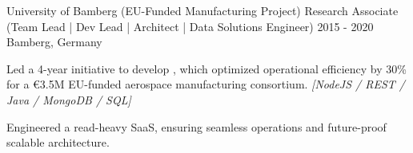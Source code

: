 \begin{cventries}
    




    
        
  \cventry
    {University of Bamberg (EU-Funded Manufacturing Project)} %
    {Research Associate (Team Lead | Dev Lead | Architect | Data Solutions Engineer)} %
    {2015 - 2020} %
    {Bamberg, Germany} %
    {
      \begin{cvitems} %
		\item {Led a 4-year initiative to develop , which optimized operational efficiency by 30\% for a €3.5M EU-funded aerospace manufacturing consortium. \textit{[NodeJS / REST / Java / MongoDB / SQL]}}
		\item {Engineered a read-heavy SaaS, ensuring seamless operations and future-proof scalable architecture.}
      \end{cvitems}
    }
    
    







\end{cventries}
